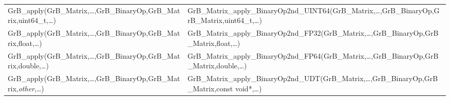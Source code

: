 \begin{landscape}
\begin{table}[htb]
{\begin{tabular}{l|l}
{\sf GrB\_apply(GrB\_Matrix,\ldots,GrB\_BinaryOp,GrB\_Matrix,uint64\_t,\ldots)}	& {\sf GrB\_Matrix\_apply\_BinaryOp2nd\_UINT64(GrB\_Matrix,\ldots,GrB\_BinaryOp,GrB\_Matrix,uint64\_t,\ldots)} \\
{\sf GrB\_apply(GrB\_Matrix,\ldots,GrB\_BinaryOp,GrB\_Matrix,float,\ldots)}		& {\sf GrB\_Matrix\_apply\_BinaryOp2nd\_FP32(GrB\_Matrix,\ldots,GrB\_BinaryOp,GrB\_Matrix,float,\ldots)} \\
{\sf GrB\_apply(GrB\_Matrix,\ldots,GrB\_BinaryOp,GrB\_Matrix,double,\ldots)}	& {\sf GrB\_Matrix\_apply\_BinaryOp2nd\_FP64(GrB\_Matrix,\ldots,GrB\_BinaryOp,GrB\_Matrix,double,\ldots)} \\
{\sf GrB\_apply(GrB\_Matrix,\ldots,GrB\_BinaryOp,GrB\_Matrix,\emph{other},\ldots)}		& {\sf GrB\_Matrix\_apply\_BinaryOp2nd\_UDT(GrB\_Matrix,\ldots,GrB\_BinaryOp,GrB\_Matrix,const void*,\ldots)} \\
\hline
\end{tabular}
}
\label{Tab:NonPolymorphic5b}
\end{table}
\end{landscape}



